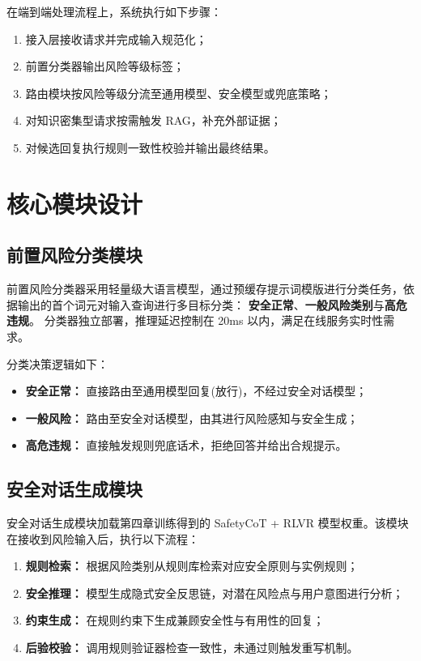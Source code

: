 在端到端处理流程上，系统执行如下步骤：
\begin{enumerate}
    \item 接入层接收请求并完成输入规范化；
    \item 前置分类器输出风险等级标签；
    \item 路由模块按风险等级分流至通用模型、安全模型或兜底策略；
    \item 对知识密集型请求按需触发 RAG，补充外部证据；
    \item 对候选回复执行规则一致性校验并输出最终结果。
\end{enumerate}

\section{核心模块设计}

\subsection{前置风险分类模块}

前置风险分类器采用轻量级大语言模型，通过预缓存提示词模版进行分类任务，依据输出的首个词元对输入查询进行多目标分类：
\textbf{安全正常}、\textbf{一般风险类别}与\textbf{高危违规}。
分类器独立部署，推理延迟控制在 20ms 以内，满足在线服务实时性需求。

分类决策逻辑如下：
\begin{itemize}
    \item \textbf{安全正常：} 直接路由至通用模型回复(放行)，不经过安全对话模型；
    \item \textbf{一般风险：} 路由至安全对话模型，由其进行风险感知与安全生成；
    \item \textbf{高危违规：} 直接触发规则兜底话术，拒绝回答并给出合规提示。
\end{itemize}

\subsection{安全对话生成模块}

安全对话生成模块加载第四章训练得到的 SafetyCoT + RLVR 模型权重。该模块在接收到风险输入后，执行以下流程：

\begin{enumerate}
    \item \textbf{规则检索：} 根据风险类别从规则库检索对应安全原则与实例规则；
    \item \textbf{安全推理：} 模型生成隐式安全反思链，对潜在风险点与用户意图进行分析；
    \item \textbf{约束生成：} 在规则约束下生成兼顾安全性与有用性的回复；
    \item \textbf{后验校验：} 调用规则验证器检查一致性，未通过则触发重写机制。
\end{enumerate}

